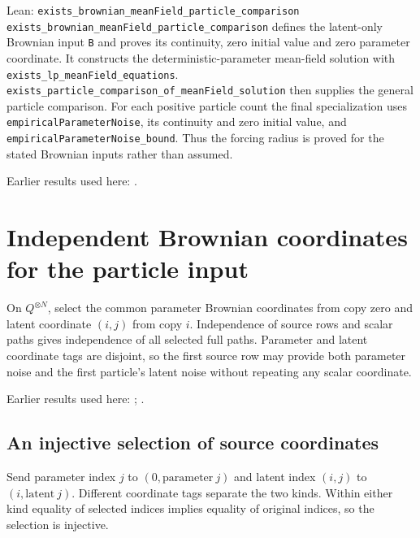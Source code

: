\documentclass[11pt,a4paper]{report}
\begin{document}
\begin{leanbox}{Lean: \texttt{exists\_\allowbreak{}brownian\_\allowbreak{}meanField\_\allowbreak{}particle\_\allowbreak{}comparison}}
\texttt{exists\_\allowbreak{}brownian\_\allowbreak{}mean\allowbreak{}Field\_\allowbreak{}particle\_\allowbreak{}comparison} defines the latent-only Brownian input \texttt{B} and proves its continuity, zero initial value and zero parameter coordinate. It constructs the deterministic-parameter mean-field solution with \texttt{exists\_\allowbreak{}lp\_\allowbreak{}mean\allowbreak{}Field\_\allowbreak{}equations}. \texttt{exists\_\allowbreak{}particle\_\allowbreak{}comparison\_\allowbreak{}of\_\allowbreak{}mean\allowbreak{}Field\_\allowbreak{}solution} then supplies the general particle comparison. For each positive particle count the final specialization uses \texttt{empirical\allowbreak{}Parameter\allowbreak{}Noise}, its continuity and zero initial value, and \texttt{empirical\allowbreak{}Parameter\allowbreak{}Noise\_\allowbreak{}bound}. Thus the forcing radius is proved for the stated Brownian inputs rather than assumed.
\end{leanbox}


Earlier results used here: \cite[Section~3.1.1]{LangevinLean2026IPLA}.
\section{\texorpdfstring{Independent Brownian coordinates for the particle input}{Independent Brownian coordinates for the particle input}}
\label{proof-module-ProximalLangevin-MeanFieldBrownianFamily-lean}


On \(Q^{\otimes N}\), select the common parameter Brownian coordinates from copy zero and latent coordinate \((i,j)\) from copy \(i\). Independence of source rows and scalar paths gives independence of all selected full paths. Parameter and latent coordinate tags are disjoint, so the first source row may provide both parameter noise and the first particle’s latent noise without repeating any scalar coordinate.



Earlier results used here: \cite[Section~3.32]{LangevinLean2026ULASC}; \cite[Section~3.8]{LangevinLean2026ULASC}.
\subsection{\texorpdfstring{An injective selection of source coordinates}{An injective selection of source coordinates}}
\label{report-step-ProximalLangevin-MeanFieldBrownianFamily-lean-1}


Send parameter index \(j\) to \((0,\mathrm{parameter}\ j)\) and latent index \((i,j)\) to \((i,\mathrm{latent}\ j)\). Different coordinate tags separate the two kinds. Within either kind equality of selected indices implies equality of original indices, so the selection is injective.
\end{document}
